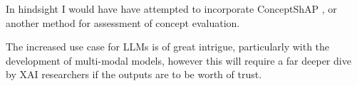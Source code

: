 In hindsight I would have have attempted to incorporate ConceptShAP \cite{yehCompletenessawareConceptBasedExplanations2019}, or another method for assessment of concept evaluation.

The increased use case for LLMs is of great intrigue, particularly with the development of multi-modal models, however this will require a far deeper dive by XAI researchers if the outputs are to be worth of trust.
